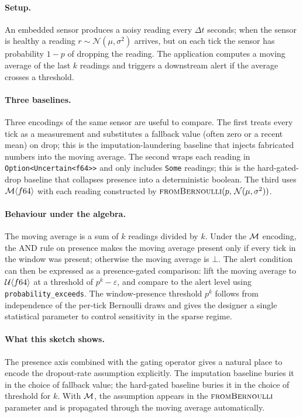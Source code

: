 \paragraph{Setup.} An embedded sensor produces a noisy reading every
$\Delta t$ seconds; when the sensor is healthy a reading $r \sim
\mathcal{N}(\mu, \sigma^2)$ arrives, but on each tick the sensor has
probability $1 - p$ of dropping the reading. The application computes a
moving average of the last $k$ readings and triggers a downstream alert
if the average crosses a threshold.

\paragraph{Three baselines.} Three encodings of the same sensor are
useful to compare. The first treats every tick as a measurement and
substitutes a fallback value (often zero or a recent mean) on drop; this
is the imputation-laundering baseline that injects fabricated numbers
into the moving average. The second wraps each reading in
\texttt{Option<Uncertain<f64>>} and only includes \texttt{Some} readings;
this is the hard-gated-drop baseline that collapses presence into a
deterministic boolean. The third uses $\mathcal{M}\langle f64 \rangle$ with
each reading constructed by $\textsc{fromBernoulli}(p,\,\mathcal{N}(\mu,
\sigma^2))$.

\paragraph{Behaviour under the algebra.} The moving average is a sum of
$k$ readings divided by $k$. Under the $\mathcal{M}$ encoding, the AND rule on
presence makes the moving average present only if every tick in the
window was present; otherwise the moving average is $\bot$. The alert
condition can then be expressed as a presence-gated comparison: lift the
moving average to $\mathcal{U}\langle f64 \rangle$ at a threshold of $p^k -
\varepsilon$, and compare to the alert level using
\texttt{probability\_exceeds}. The window-presence threshold $p^k$
follows from independence of the per-tick Bernoulli draws and gives the
designer a single statistical parameter to control sensitivity in the
sparse regime.

\paragraph{What this sketch shows.} The presence axis combined with the
gating operator gives a natural place to encode the dropout-rate
assumption explicitly. The imputation baseline buries it in the choice of
fallback value; the hard-gated baseline buries it in the choice of
threshold for $k$. With $\mathcal{M}$, the assumption appears in the
$\textsc{fromBernoulli}$ parameter and is propagated through the moving
average automatically.

